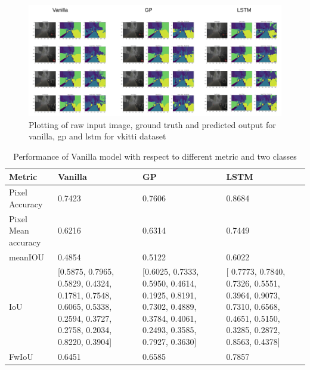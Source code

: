 	\begin{figure}[h]
		\centering
		\includegraphics[width=17cm]{images/unet_vkitti_two.png}
		\caption{Plotting of raw input image, ground truth and predicted output for vanilla, gp and lstm for vkitti dataset}
		\label{fig:vkitti_unet_two}
	\end{figure}

	\begin{table}
		\begin{center}
			\begin{tabular}{ | l | p{4cm} | p{4cm} | p{4cm} |}
				\hline
				
				\cellcolor{purple!30}Metric & \cellcolor{purple!30}Vanilla & \cellcolor{purple!30}GP & \cellcolor{purple!30}LSTM\\ \hline
				
				Pixel Accuracy & 0.7423 & 0.7606 & 0.8684 \\ \hline
				Pixel Mean accuracy & 0.6216 & 0.6314 & 0.7449 \\ \hline
				meanIOU & 0.4854 & 0.5122 & 0.6022 \\ \hline
				IoU & [0.5875, 0.7965,	0.5829,	0.4324,	0.1781,	0.7548,	0.6065,	0.5338,	0.2594,	0.3727,	0.2758,	0.2034,	0.8220,	0.3904] & 
				[0.6025,	0.7333,	0.5950, 0.4614,	0.1925,	0.8191,	0.7302,	0.4889,	0.3784,	0.4061,	0.2493,	0.3585,	0.7927,	0.3630] 
				& [ 0.7773,	0.7840,	0.7326,	0.5551,	0.3964,	0.9073,	0.7310,	0.6568,	0.4651,	0.5150,	0.3285,	0.2872,	0.8563,	0.4378]
				\\ \hline
				FwIoU & 0.6451 & 0.6585 & 0.7857 \\ \hline
				\hline
			\end{tabular}
			\caption{Performance of Vanilla model with respect to different metric and two classes}
			\label{table:unet_vkitti_two_classes}
		\end{center}
	\end{table}
	
